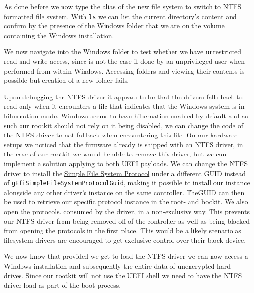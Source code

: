 As done before we now type the alias of the new file system to switch to NTFS formatted file system.
With \lstinline{ls} we can list the current directory's content and confirm by the presence of the Windows folder that we are on the volume containing the Windows installation.


We now navigate into the Windows folder to test whether we have unrestricted read and write access, since is not the case if done by an unprivileged user when performed from within Windows.
Accessing folders and viewing their contents is possible but creation of a new folder fails.

Upon debugging the \ac{NTFS} driver it appears to be that the drivers falls back to read only when it encounters a file that indicates that the Windows system is in hibernation mode.
Windows seems to have hibernation enabled by default and as such our rootkit should not rely on it being disabled, we can change the code of the \ac{NTFS} driver to not fallback when encountering this file. 
On our hardware setups we noticed that the firmware already is shipped with an \ac{NTFS} driver, in the case of our rootkit we would be able to remove this driver, but we can implement a solution applying to both \ac{UEFI} payloads. We can change the \ac{NTFS} driver to install the \hyperref[lst:simple-file-system-protocol]{Simple File System Protocol} under a different \ac{GUID} instead of \lstinline{gEfiSimpleFileSystemProtocolGuid}, making it possible to install our instance alongside any other driver's instance on the same controller. The\ac{GUID} can then be used to retrieve our specific protocol instance in the root- and bookit. We also open the protocols, consumed by the driver, in a non-exclusive way. This prevents our \ac{NTFS} driver from being removed off of the controller as well as being blocked from opening the protocols in the first place\cite[7.3]{uefi-spec}. This would be a likely scenario as filesystem drivers are encouraged to get exclusive control over their block device\cite[13.5]{uefi-spec}.

We now know that provided we get to load the \ac{NTFS} driver we can now access a Windows installation and subsequently the entire data of unencrypted hard drives.
Since our rootkit will not use the UEFI shell we need to have the \ac{NTFS} driver load as part of the boot process.

